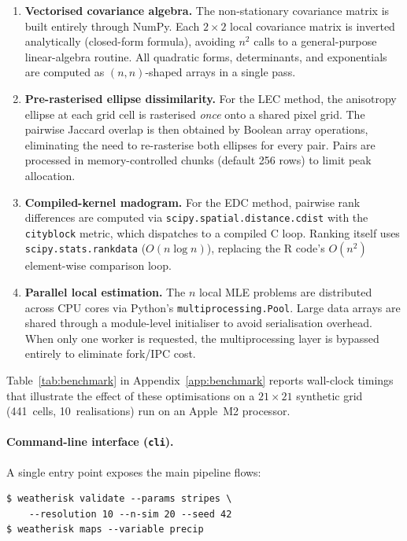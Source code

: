 \documentclass[preprint,12pt,a4paper]{elsarticle}
\begin{document}
\begin{enumerate}
\item \textbf{Vectorised covariance algebra.}
  The non-stationary covariance matrix is built entirely through
  NumPy.  Each $2\times 2$ local covariance matrix is
  inverted analytically (closed-form formula), avoiding $n^2$ calls
  to a general-purpose linear-algebra routine.  All quadratic forms,
  determinants, and exponentials are computed as $(n, n)$-shaped
  arrays in a single pass.

\item \textbf{Pre-rasterised ellipse dissimilarity.}
  For the LEC method, the anisotropy ellipse at each grid cell is
  rasterised \emph{once} onto a shared pixel grid.  The pairwise
  Jaccard overlap is then obtained by Boolean array operations,
  eliminating the need to re-rasterise both ellipses for every pair.
  Pairs are processed in memory-controlled chunks (default 256 rows)
  to limit peak allocation.

\item \textbf{Compiled-kernel madogram.}
  For the EDC method, pairwise rank differences are computed via
  \texttt{scipy.spatial.distance.cdist} with the \texttt{cityblock}
  metric, which dispatches to a compiled C loop.  Ranking itself
  uses \texttt{scipy.stats.rankdata} ($O(n \log n)$), replacing the
  R code's $O(n^2)$ element-wise comparison loop.

\item \textbf{Parallel local estimation.}
  The $n$ local MLE problems are distributed across CPU cores via
  Python's \texttt{multiprocessing.Pool}.  Large data arrays are
  shared through a module-level initialiser to avoid serialisation
  overhead.  When only one worker is requested, the multiprocessing
  layer is bypassed entirely to eliminate fork/IPC cost.
\end{enumerate}

Table~\ref{tab:benchmark} in Appendix~\ref{app:benchmark} reports
wall-clock timings that illustrate the effect of these optimisations
on a $21\times 21$ synthetic grid (441~cells, 10~realisations) run
on an Apple~M2 processor.

\paragraph{Command-line interface (\texttt{cli}).}
A single entry point exposes the main pipeline flows:
\begin{lstlisting}[numbers=none]
$ weatherisk validate --params stripes \
    --resolution 10 --n-sim 20 --seed 42
$ weatherisk maps --variable precip
\end{lstlisting}
\end{document}
